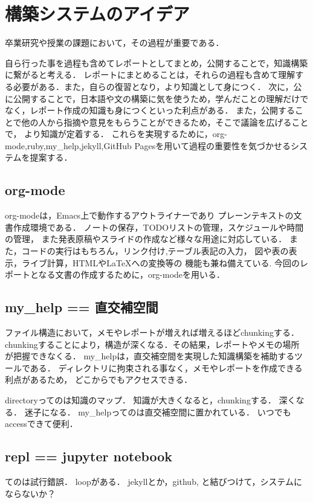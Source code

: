 \documentclass{hissymp}
\begin{document}
\section{構築システムのアイデア}
\label{sec:orgcdc3fec}

卒業研究や授業の課題において，その過程が重要である．

自ら行った事を過程も含めてレポートとしてまとめ，公開することで，知識構築に繋がると考える．
レポートにまとめることは，それらの過程も含めて理解する必要がある．また，自らの復習となり，より知識として身につく．
次に，公に公開することで，日本語や文の構築に気を使うため，学んだことの理解だけでなく，レポート作成の知識も身につくといった利点がある．
また，公開することで他の人から指摘や意見をもらうことができるため，そこで議論を広げることで，
より知識が定着する．
これらを実現するために，org-mode,ruby,my\_help,jekyll,GitHub Pagesを用いて過程の重要性を気づかせるシステムを提案する．
\subsection{org-mode}
\label{sec:orgbd24d5c}
org-modeは，Emacs上で動作するアウトライナーであり
プレーンテキストの文書作成環境である．
ノートの保存，TODOリストの管理，スケジュールや時間の管理，
また発表原稿やスライドの作成など様々な用途に対応している．
また，コードの実行はもちろん，リンク付け,テーブル表記の入力，
図や表の表示，ライブ計算，HTMLや\LaTeX{}への変換等の
機能も兼ね備えている.
今回のレポートとなる文書の作成するために，org-modeを用いる．

\subsection{my\_help == 直交補空間}
\label{sec:org65ae423}
ファイル構造において，メモやレポートが増えれば増えるほどchunkingする．
chunkingすることにより，構造が深くなる．その結果，レポートやメモの場所
が把握できなくる．
my\_helpは，直交補空間を実現した知識構築を補助するツールである．
ディレクトリに拘束される事なく，メモやレポートを作成できる利点があるため，
どこからでもアクセスできる．



directoryってのは知識のマップ．
知識が大きくなると，chunkingする．
深くなる．
迷子になる．
my\_helpってのは直交補空間に置かれている．
いつでもaccessできて便利．

\subsection{repl == jupyter notebook}
\label{sec:org63f6156}
てのは試行錯誤．
loopがある．
jekyllとか，github, と結びつけて，システムにならないか？
\end{document}
